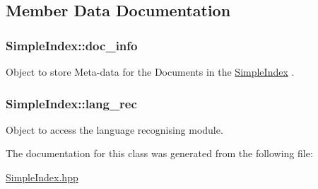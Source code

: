\subsection{Member Data Documentation}
\hypertarget{class_simple_index_a7d3e80897ed6c69cdd4d61297cde527a}{
\subsubsection[{doc\-\_\-info}]{ Simple\-Index\-::doc\-\_\-info}}\label{class_simple_index_a7d3e80897ed6c69cdd4d61297cde527a}
Object to store Meta-\/data for the Documents in the \hyperlink{class_simple_index}{Simple\-Index} . \hypertarget{class_simple_index_aac925e5941373e3a2d711b3282618790}{
\subsubsection[{lang\-\_\-rec}]{ Simple\-Index\-::lang\-\_\-rec}}\label{class_simple_index_aac925e5941373e3a2d711b3282618790}
Object to access the language recognising module. 

The documentation for this class was generated from the following file\-:\begin{DoxyCompactItemize}
\item 
\hyperlink{_simple_index_8hpp}{Simple\-Index.\-hpp}\end{DoxyCompactItemize}
